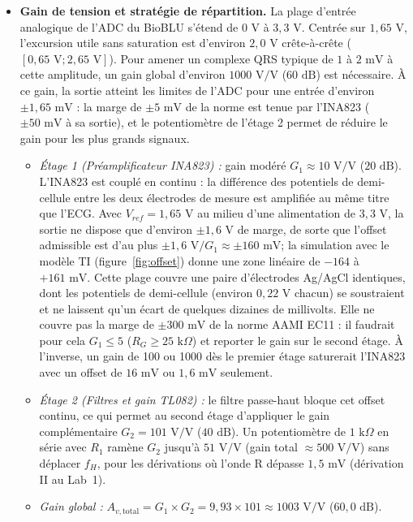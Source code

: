 \documentclass[11pt,letterpaper]{article}
\begin{document}
\begin{itemize}
\item \textbf{Gain de tension et stratégie de répartition.} La plage d'entrée analogique de l'ADC du BioBLU s'étend de $0\text{ V}$ à $3,3\text{ V}$. Centrée sur $1,65\text{ V}$, l'excursion utile sans saturation est d'environ $2,0\text{ V}$ crête-à-crête ($[0,65\text{ V} ; 2,65\text{ V}]$). Pour amener un complexe QRS typique de $1$ à $2\text{ mV}$ à cette amplitude, un gain global d'environ $1000\text{ V/V}$ ($60\text{ dB}$) est nécessaire. À ce gain, la sortie atteint les limites de l'ADC pour une entrée d'environ $\pm 1,65\text{ mV}$ : la marge de $\pm 5\text{ mV}$ de la norme est tenue par l'INA823 ($\pm 50\text{ mV}$ à sa sortie), et le potentiomètre de l'étage 2 permet de réduire le gain pour les plus grands signaux.
\begin{itemize}
\item \textit{Étage 1 (Préamplificateur INA823) :} gain modéré $G_1 \approx 10\text{ V/V}$ ($20\text{ dB}$). L'INA823 est couplé en continu : la différence des potentiels de demi-cellule entre les deux électrodes de mesure est amplifiée au même titre que l'ECG. Avec $V_{ref} = 1,65\text{ V}$ au milieu d'une alimentation de $3,3\text{ V}$, la sortie ne dispose que d'environ $\pm 1,6\text{ V}$ de marge, de sorte que l'offset admissible est d'au plus $\pm 1,6\text{ V} / G_1 \approx \pm 160\text{ mV}$; la simulation avec le modèle TI (figure~\ref{fig:offset}) donne une zone linéaire de $-164$ à $+161\text{ mV}$. Cette plage couvre une paire d'électrodes Ag/AgCl identiques, dont les potentiels de demi-cellule (environ $0,22\text{ V}$ chacun) se soustraient et ne laissent qu'un écart de quelques dizaines de millivolts. Elle ne couvre pas la marge de $\pm 300\text{ mV}$ de la norme AAMI EC11 : il faudrait pour cela $G_1 \le 5$ ($R_G \ge 25\text{ k}\Omega$) et reporter le gain sur le second étage. À l'inverse, un gain de 100 ou 1000 dès le premier étage saturerait l'INA823 avec un offset de $16\text{ mV}$ ou $1,6\text{ mV}$ seulement.
\item \textit{Étage 2 (Filtres et gain TL082) :} le filtre passe-haut bloque cet offset continu, ce qui permet au second étage d'appliquer le gain complémentaire $G_2 = 101\text{ V/V}$ ($40\text{ dB}$). Un potentiomètre de $1\text{ k}\Omega$ en série avec $R_1$ ramène $G_2$ jusqu'à $51\text{ V/V}$ (gain total $\approx 500\text{ V/V}$) sans déplacer $f_H$, pour les dérivations où l'onde R dépasse $1,5\text{ mV}$ (dérivation II au Lab~1).
\item \textit{Gain global :} $A_{v,\text{total}} = G_1 \times G_2 = 9,93 \times 101 \approx 1003\text{ V/V}$ ($60,0\text{ dB}$).
\end{itemize}
\end{itemize}
\end{document}
